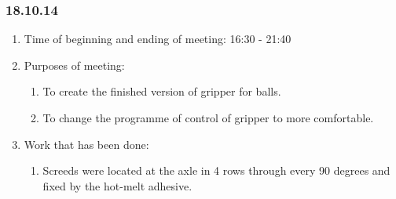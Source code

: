
\subsubsection{18.10.14}

\begin{enumerate}
	\item Time of beginning and ending of meeting:
	16:30 - 21:40
	\item Purposes of meeting:
	\begin{enumerate}
	  \item To create the finished version of gripper for balls.
	  
	  \item To change the programme of control of gripper to more comfortable.
	  
    \end{enumerate}
    
	\item Work that has been done:
	\begin{enumerate}
      
      \item Screeds were located at the axle in 4 rows through every 90 degrees and fixed by the hot-melt adhesive.
      

\end{enumerate}
\end{enumerate}
